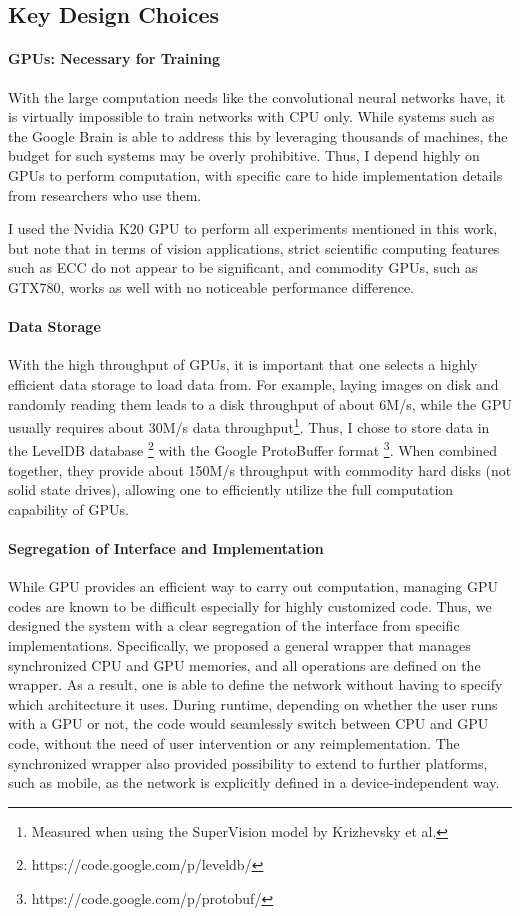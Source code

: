 \subsection{Key Design Choices}
\paragraph{GPUs: Necessary for Training} With the large computation needs like the convolutional neural networks have, it is virtually impossible to train networks with CPU only. While systems such as the Google Brain \cite{le2012icml} is able to address this by leveraging thousands of machines, the budget for such systems may be overly prohibitive. Thus, I depend highly on GPUs to perform computation, with specific care to hide implementation details from researchers who use them.

I used the Nvidia K20 GPU to perform all experiments mentioned in this work, but note that in terms of vision applications, strict scientific computing features such as ECC do not appear to be significant, and commodity GPUs, such as GTX780, works as well with no noticeable performance difference.

\paragraph{Data Storage} With the high throughput of GPUs, it is important that one selects a highly efficient data storage to load data from. For example, laying images on disk and randomly reading them leads to a disk throughput of about 6M/s, while the GPU usually requires about 30M/s data throughput\footnote{Measured when using the SuperVision model by Krizhevsky et al.}. Thus, I chose to store data in the LevelDB database \footnote{https://code.google.com/p/leveldb/} with the Google ProtoBuffer format \footnote{https://code.google.com/p/protobuf/}. When combined together, they provide about 150M/s throughput with commodity hard disks (not solid state drives), allowing one to efficiently utilize the full computation capability of GPUs.

\paragraph{Segregation of Interface and Implementation} While GPU provides an efficient way to carry out computation, managing GPU codes are known to be difficult especially for highly customized code. Thus, we designed the system with a clear segregation of the interface from specific implementations. Specifically, we proposed a general wrapper that manages synchronized CPU and GPU memories, and all operations are defined on the wrapper. As a result, one is able to define the network without having to specify which architecture it uses. During runtime, depending on whether the user runs with a GPU or not, the code would seamlessly switch between CPU and GPU code, without the need of user intervention or any reimplementation. The synchronized wrapper also provided possibility to extend to further platforms, such as mobile, as the network is explicitly defined in a device-independent way.


